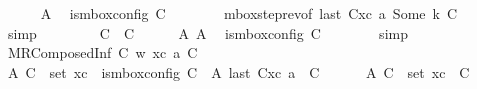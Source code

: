 \begin{isabellebody}
\ \ \ \ \isamarkupfalse%
\ A{}\ \isamarkupfalse%
\ {\isachardoublequoteopen}is{\isacharunderscore}{\kern0pt}mbox{\isacharunderscore}{\kern0pt}config\ C{\isacharprime}{\kern0pt}{\isachardoublequoteclose}\isanewline
\ \ \ \ \ \ \isamarkupfalse%
\ mbox{\isacharunderscore}{\kern0pt}step{\isacharunderscore}{\kern0pt}rev{\isacharparenleft}{\kern0pt}{}{\isacharparenright}{\kern0pt}{\isacharbrackleft}{\kern0pt}of\ {\isachardoublequoteopen}last\ {\isacharparenleft}{\kern0pt}C{}{\isacharhash}{\kern0pt}xc{\isacharparenright}{\kern0pt}{\isachardoublequoteclose}\ a\ {\isachardoublequoteopen}Some\ k{\isachardoublequoteclose}\ C{\isacharbrackright}{\kern0pt}\isanewline
\ \ \ \ \ \ \isamarkupfalse%
\ simp\isanewline
\ \ \isamarkupfalse%
\isanewline
\ \ \ \ \isamarkupfalse%
\ {\isachardoublequoteopen}C\ {\isasymnoteq}\ C{\isacharprime}{\kern0pt}{\isachardoublequoteclose}\isanewline
\ \ \ \ \isamarkupfalse%
\ A{}\ A{}\ \isamarkupfalse%
\ {\isachardoublequoteopen}is{\isacharunderscore}{\kern0pt}mbox{\isacharunderscore}{\kern0pt}config\ C{\isacharprime}{\kern0pt}{\isachardoublequoteclose}\isanewline
\ \ \ \ \ \ \isamarkupfalse%
\ simp\isanewline
\ \ \isamarkupfalse%
\isanewline
{}\isamarkupfalse%
\isanewline
\ \ \isamarkupfalse%
\ {\isacharparenleft}{\kern0pt}MRComposedInf\ C{}\ w\ xc\ a\ C{\isacharparenright}{\kern0pt}\isanewline
\ \ \isamarkupfalse%
\ A{}{\isacharcolon}{\kern0pt}\ {\isachardoublequoteopen}C{\isacharprime}{\kern0pt}\ {\isasymin}\ set\ xc\ {\isasymLongrightarrow}\ is{\isacharunderscore}{\kern0pt}mbox{\isacharunderscore}{\kern0pt}config\ C{\isacharprime}{\kern0pt}{\isachardoublequoteclose}\ \ A{}{\isacharcolon}{\kern0pt}\ {\isachardoublequoteopen}last\ {\isacharparenleft}{\kern0pt}C{}{\isacharhash}{\kern0pt}xc{\isacharparenright}{\kern0pt}\ {\isasymmidarrow}{\isasymlangle}a{\isacharcomma}{\kern0pt}\ {\isasyminfinity}{\isasymrangle}{\isasymrightarrow}\ C{\isachardoublequoteclose}\isanewline
\ \ \ \ \ \ A{}{\isacharcolon}{\kern0pt}\ {\isachardoublequoteopen}C{\isacharprime}{\kern0pt}\ {\isasymin}\ set\ {\isacharparenleft}{\kern0pt}xc\ {\isasymcdot}\ {\isacharbrackleft}{\kern0pt}C{\isacharbrackright}{\kern0pt}{\isacharparenright}{\kern0pt}{\isachardoublequoteclose}\isanewline

\end{isabellebody}
